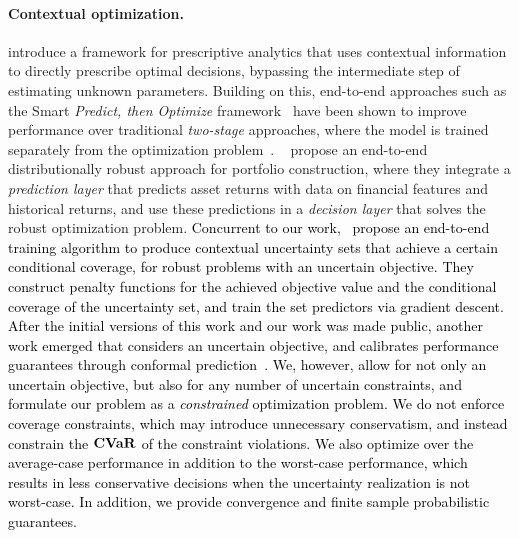 \documentclass[11pt]{article}
\newcommand{\bsnote}[1]{\noindent\textcolor{red}{\texttt{Bartolomeo: #1}}}
\newcommand{\inote}[1]{\noindent\textcolor{orange}{\texttt{Irina: #1}}}
\newcommand{\RC}[1]{\textcolor{black}{#1}}
\begin{document}
\paragraph{Contextual optimization. } 
\cite{bertsimas2020predictive} introduce a framework for prescriptive analytics that uses contextual information to directly prescribe optimal decisions, bypassing the intermediate step of estimating unknown parameters.
Building on this, end-to-end approaches such as the Smart {\it Predict, then Optimize} framework~\citep{predict_opt} have been shown to improve performance over traditional {\it two-stage} approaches, where the model is trained separately from the optimization problem~\citep{end-port}.
~\cite{end-port} propose an end-to-end distributionally robust approach for portfolio construction, where they integrate a {\it prediction layer} that predicts asset returns with data on financial features and historical returns, and use these predictions in a {\it decision layer} that solves the robust optimization problem.
\RC{Concurrent to our work,~\cite{cond-cov} propose an end-to-end training algorithm to produce contextual uncertainty sets that achieve a certain conditional coverage, for robust problems with an uncertain objective. They construct penalty functions for the achieved objective value and the conditional coverage of the uncertainty set, and train the set predictors via gradient descent. 
After the initial versions of this work and our work was made public, another work emerged that considers an uncertain objective, and calibrates performance guarantees through conformal prediction~\citep{yeh}. 
We, however, allow for not only an uncertain objective, but also for any number of uncertain constraints, and formulate our problem as a {\it constrained} optimization problem. We do not enforce coverage constraints, which may introduce unnecessary conservatism, and instead constrain the $\mathop{\bf CVaR}$ of the constraint violations. We also optimize over the average-case performance in addition to the worst-case performance, which results in less conservative decisions when the uncertainty realization is not worst-case. 
In addition, we provide convergence and finite sample probabilistic guarantees.}
\end{document}
